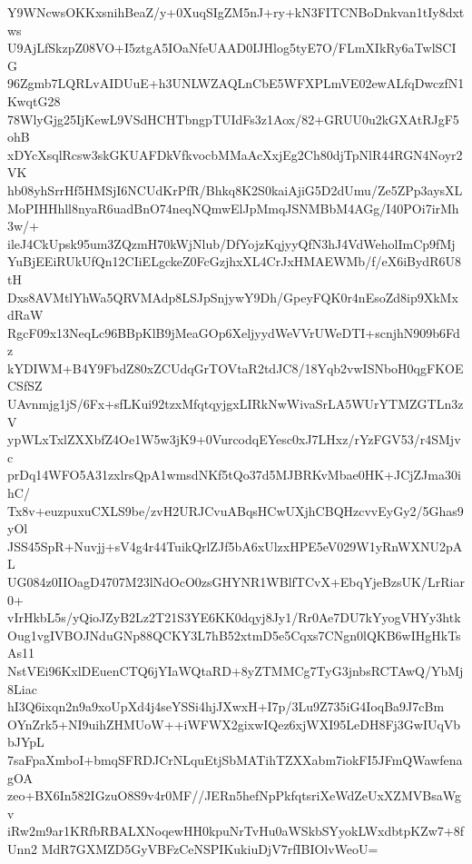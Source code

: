 Y9WNcwsOKKxsnihBeaZ/y+0XuqSIgZM5nJ+ry+kN3FITCNBoDnkvan1tIy8dxtws
U9AjLfSkzpZ08VO+I5ztgA5IOaNfeUAAD0IJHlog5tyE7O/FLmXIkRy6aTwlSCIG
96Zgmb7LQRLvAIDUuE+h3UNLWZAQLnCbE5WFXPLmVE02ewALfqDwczfN1KwqtG28
78WlyGjg25IjKewL9VSdHCHTbngpTUIdFs3z1Aox/82+GRUU0u2kGXAtRJgF5ohB
xDYcXsqlRcsw3skGKUAFDkVfkvocbMMaAcXxjEg2Ch80djTpNlR44RGN4Noyr2VK
hb08yhSrrHf5HMSjI6NCUdKrPfR/Bhkq8K2S0kaiAjiG5D2dUmu/Ze5ZPp3aysXL
MoPIHHhll8nyaR6uadBnO74neqNQmwElJpMmqJSNMBbM4AGg/I40POi7irMh3w/+
ileJ4CkUpsk95um3ZQzmH70kWjNlub/DfYojzKqjyyQfN3hJ4VdWeholImCp9fMj
YuBjEEiRUkUfQn12CIiELgckeZ0FcGzjhxXL4CrJxHMAEWMb/f/eX6iBydR6U8tH
Dxs8AVMtlYhWa5QRVMAdp8LSJpSnjywY9Dh/GpeyFQK0r4nEsoZd8ip9XkMxdRaW
RgcF09x13NeqLc96BBpKlB9jMeaGOp6XeljyydWeVVrUWeDTI+scnjhN909b6Fdz
kYDIWM+B4Y9FbdZ80xZCUdqGrTOVtaR2tdJC8/18Yqb2vwISNboH0qgFKOECSfSZ
UAvnmjg1jS/6Fx+sfLKui92tzxMfqtqyjgxLIRkNwWivaSrLA5WUrYTMZGTLn3zV
ypWLxTxlZXXbfZ4Oe1W5w3jK9+0VurcodqEYesc0xJ7LHxz/rYzFGV53/r4SMjvc
prDq14WFO5A31zxlrsQpA1wmsdNKf5tQo37d5MJBRKvMbae0HK+JCjZJma30ihC/
Tx8v+euzpuxuCXLS9be/zvH2URJCvuABqsHCwUXjhCBQHzcvvEyGy2/5Ghas9yOl
JSS45SpR+Nuvjj+sV4g4r44TuikQrlZJf5bA6xUlzxHPE5eV029W1yRnWXNU2pAL
UG084z0IIOagD4707M23lNdOcO0zsGHYNR1WBlfTCvX+EbqYjeBzsUK/LrRiar0+
vIrHkbL5s/yQioJZyB2Lz2T21S3YE6KK0dqyj8Jy1/Rr0Ae7DU7kYyogVHYy3htk
Oug1vgIVBOJNduGNp88QCKY3L7hB52xtmD5e5Cqxs7CNgn0lQKB6wIHgHkTsAs11
NstVEi96KxlDEuenCTQ6jYIaWQtaRD+8yZTMMCg7TyG3jnbsRCTAwQ/YbMj8Liac
hI3Q6ixqn2n9a9xoUpXd4j4seYSSi4hjJXwxH+I7p/3Lu9Z735iG4IoqBa9J7cBm
OYnZrk5+NI9uihZHMUoW++iWFWX2gixwIQez6xjWXI95LeDH8Fj3GwIUqVbbJYpL
7saFpaXmboI+bmqSFRDJCrNLquEtjSbMATihTZXXabm7iokFI5JFmQWawfenagOA
zeo+BX6In582IGzuO8S9v4r0MF//JERn5hefNpPkfqtsriXeWdZeUxXZMVBsaWgv
iRw2m9ar1KRfbRBALXNoqewHH0kpuNrTvHu0aWSkbSYyokLWxdbtpKZw7+8fUnn2
MdR7GXMZD5GyVBFzCeNSPIKukiuDjV7rfIBIOlvWeoU=
